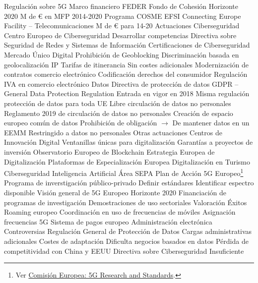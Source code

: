 \documentclass{nuevotema}
\begin{document}
\begin{esquemal}
			\3 Regulación sobre 5G
		\2 Marco financiero
			\3 FEDER
			\3 Fondo de Cohesión
			\3 Horizonte 2020
				 M de € en MFP 2014-2020
			\3 Programa COSME
			\3 EFSI
			\3 Connecting Europe Facility -- Telecomunicaciones
				 M de € para 14-20
		\2 Actuaciones
			\3 Ciberseguridad
				\4 Centro Europeo de Ciberseguridad
				\4[] Desarrollar competencias
				\4 Directiva sobre Seguridad de Redes y Sistemas de Información
				\4 Certificaciones de Ciberseguridad
			\3 Mercado Único Digital
				\4 Prohibición de Geoblocking
				\4[] Discriminación basada en geolocalización IP
				\4 Tarifas de itinerancia
				\4[] Sin costes adicionales
				\4 Modernización de contratos comercio electrónico
				\4 Codificación derechos del consumidor
				\4 Regulación IVA en comercio electrónico
			\3 Datos
				\4 Directiva de protección de datos
				\4[] GDPR -- General Data Protection Regulation
				\4[] Entrada en vigor en 2018
				\4[] Misma regulación protección de datos para toda UE
				\4 Libre circulación de datos no personales
				\4 Reglamento 2019 de circulación de datos no personales
				\4[] Creación de espacio europeo común de datos
				\4[] Prohibición de obligación
				\4[] $\to$ De mantener datos en un EEMM
				\4[] Restringido a datos no personales
			\3 Otras actuaciones
				\4 Centros de Innovación Digital
				\4[] Ventanillas únicas para digitalización
				\4 Garantías a proyectos de inversión
				\4 Observatorio Europeo de Blockchain
				\4 Estrategia Europea de Digitalización
				\4 Plataformas de Especialización Europea
				\4[] Digitalización en Turismo
				\4[] Ciberseguridad
				\4[] Inteligencia Artificial
				\4 Área SEPA
			\3 Plan de Acción 5G Europeo\footnote{Ver \href{https://ec.europa.eu/digital-single-market/en/research-standards}{Comisión Europea: 5G Research and Standards}.}
				\4 Programa de inverstigación público-privado
				\4[] Definir estándares
				\4[] Identificar espectro disponible
				\4[] Visión general de 5G Europeo
				\4 Horizonte 2020
				\4[] Financiación de programas de investigación
				\4 Demostraciones de uso sectoriales
		\2 Valoración
			\3 Éxitos
				\4 Roaming europeo
				\4 Coordinación en uso de frecuencias de móviles
				\4 Asignación frecuencias 5G
				\4 Sistema de pagos europeo
				\4 Administración electrónica
			\3 Controversias
				\4 Regulación General de Protección de Datos
				\4[] Cargas administrativas adicionales
				\4[] Costes de adaptación
				\4[] Dificulta negocios basados en datos
				\4[] Pérdida de competitividad con China y EEUU
				\4 Directiva sobre Ciberseguridad
				\4[] Insuficiente

\end{esquemal}
\end{document}
